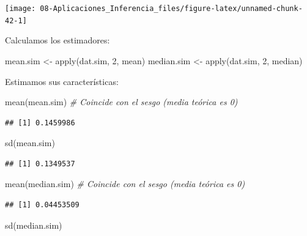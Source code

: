 \documentclass[
]{book}
\newenvironment{Shaded}{\begin{snugshade}}{\end{snugshade}}
\newcommand{\CommentTok}[1]{\textcolor[rgb]{0.56,0.35,0.01}{\textit{#1}}}
\newcommand{\DecValTok}[1]{\textcolor[rgb]{0.00,0.00,0.81}{#1}}
\newcommand{\FunctionTok}[1]{\textcolor[rgb]{0.00,0.00,0.00}{#1}}
\newcommand{\NormalTok}[1]{#1}
\newcommand{\OtherTok}[1]{\textcolor[rgb]{0.56,0.35,0.01}{#1}}
\theoremstyle{break}
\theoremstyle{definition}
\theoremstyle{definition}
\theoremstyle{definition}
\theoremstyle{definition}
\theoremstyle{remark}
\begin{document}
\begin{enumerate}
  \begin{center}\texttt{[image: 08-Aplicaciones\_Inferencia\_files/figure-latex/unnamed-chunk-42-1]} \end{center}

  Calculamos los estimadores:

\begin{Shaded}
\begin{Highlighting}[]
\NormalTok{mean.sim }\OtherTok{\textless{}{-}} \FunctionTok{apply}\NormalTok{(dat.sim, }\DecValTok{2}\NormalTok{, mean)}
\NormalTok{median.sim }\OtherTok{\textless{}{-}} \FunctionTok{apply}\NormalTok{(dat.sim, }\DecValTok{2}\NormalTok{, median)}
\end{Highlighting}
\end{Shaded}

  Estimamos sus características:

\begin{Shaded}
\begin{Highlighting}[]
\FunctionTok{mean}\NormalTok{(mean.sim) }\CommentTok{\# Coincide con el sesgo (media teórica es 0)}
\end{Highlighting}
\end{Shaded}

\begin{verbatim}
## [1] 0.1459986
\end{verbatim}

\begin{Shaded}
\begin{Highlighting}[]
\FunctionTok{sd}\NormalTok{(mean.sim)}
\end{Highlighting}
\end{Shaded}

\begin{verbatim}
## [1] 0.1349537
\end{verbatim}

\begin{Shaded}
\begin{Highlighting}[]
\FunctionTok{mean}\NormalTok{(median.sim) }\CommentTok{\# Coincide con el sesgo (media teórica es 0)}
\end{Highlighting}
\end{Shaded}

\begin{verbatim}
## [1] 0.04453509
\end{verbatim}

\begin{Shaded}
\begin{Highlighting}[]
\FunctionTok{sd}\NormalTok{(median.sim)}
\end{Highlighting}
\end{Shaded}


\end{enumerate}
\end{document}
